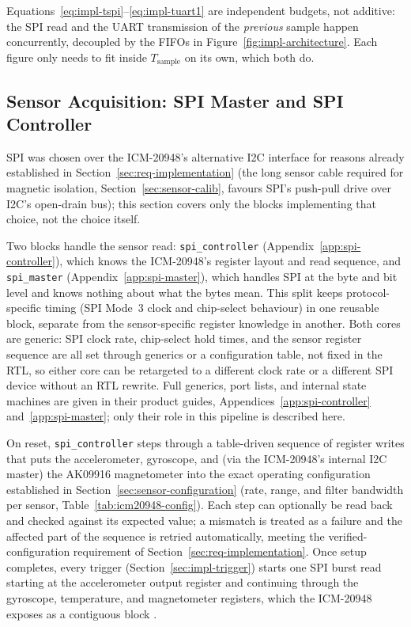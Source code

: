 \documentclass[12pt,a4paper]{article}
\begin{document}
{Equations~\eqref{eq:impl-tspi}--\eqref{eq:impl-tuart1} are independent
budgets, not additive: the SPI read and the UART transmission of the
\emph{previous} sample happen concurrently, decoupled by the FIFOs in
Figure~\ref{fig:impl-architecture}. Each figure only needs to fit inside
$T_{\text{sample}}$ on its own, which both do.

\subsection{Sensor Acquisition: SPI Master and SPI Controller}
\label{sec:impl-spi}

SPI was chosen over the ICM-20948's alternative I2C interface for
reasons already established in Section~\ref{sec:req-implementation}
(the long sensor cable required for magnetic isolation, Section~\ref{sec:sensor-calib},
favours SPI's push-pull drive over I2C's open-drain bus); this section
covers only the blocks implementing that choice, not the choice itself.

Two blocks handle the sensor read: \texttt{spi\_controller}
(Appendix~\ref{app:spi-controller}), which knows the ICM-20948's
register layout and read sequence, and \texttt{spi\_master}
(Appendix~\ref{app:spi-master}), which handles SPI at the byte and bit
level and knows nothing about what the bytes mean. This split keeps
protocol-specific timing (SPI Mode~3 clock and chip-select behaviour) in
one reusable block, separate from the sensor-specific register knowledge
in another. Both cores are generic: SPI clock rate, chip-select hold
times, and the sensor register sequence are all set through generics or
a configuration table, not fixed in the RTL, so either core can be
retargeted to a different clock rate or a different SPI device without
an RTL rewrite. Full generics, port lists, and internal state machines
are given in their product guides, Appendices~\ref{app:spi-controller}
and~\ref{app:spi-master}; only their role in this pipeline is described
here.

On reset, \texttt{spi\_controller} steps through a table-driven sequence
of register writes that puts the accelerometer, gyroscope, and (via the
ICM-20948's internal I2C master) the AK09916 magnetometer into the exact
operating configuration established in
Section~\ref{sec:sensor-configuration} (rate, range, and filter
bandwidth per sensor, Table~\ref{tab:icm20948-config}). Each step can optionally be read back and
checked against its expected value; a mismatch is treated as a failure
and the affected part of the sequence is retried automatically, meeting
the verified-configuration requirement of
Section~\ref{sec:req-implementation}. Once setup completes, every
trigger (Section~\ref{sec:impl-trigger}) starts one SPI burst read
starting at the accelerometer output register and continuing through
the gyroscope, temperature, and magnetometer registers, which the
ICM-20948 exposes as a contiguous block \cite{tdk_icm20948_ds}.

}
\end{document}
